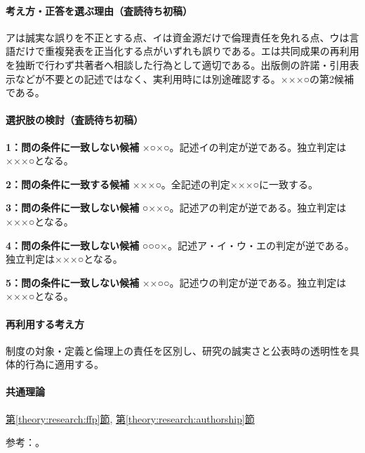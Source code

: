 \paragraph{考え方・正答を選ぶ理由（査読待ち初稿）} アは誠実な誤りを不正とする点、イは資金源だけで倫理責任を免れる点、ウは言語だけで重複発表を正当化する点がいずれも誤りである。エは共同成果の再利用を独断で行わず共著者へ相談した行為として適切である。出版側の許諾・引用表示などが不要との記述ではなく、実利用時には別途確認する。×××○の第2候補である。

\paragraph{選択肢の検討（査読待ち初稿）}\mbox{}\par

\noindent\textbf{1：問の条件に一致しない候補} ×○×○。記述イの判定が逆である。独立判定は×××○となる。\par

\noindent\textbf{2：問の条件に一致する候補} ×××○。全記述の判定×××○に一致する。\par

\noindent\textbf{3：問の条件に一致しない候補} ○××○。記述アの判定が逆である。独立判定は×××○となる。\par

\noindent\textbf{4：問の条件に一致しない候補} ○○○×。記述ア・イ・ウ・エの判定が逆である。独立判定は×××○となる。\par

\noindent\textbf{5：問の条件に一致しない候補} ××○○。記述ウの判定が逆である。独立判定は×××○となる。\par

\paragraph{再利用する考え方} 制度の対象・定義と倫理上の責任を区別し、研究の誠実さと公表時の透明性を具体的行為に適用する。

\paragraph{共通理論} \hyperref[theory:research:ffp]{第\ref*{theory:research:ffp}節}, \hyperref[theory:research:authorship]{第\ref*{theory:research:authorship}節}

\par 参考：\cite{mext_misconduct2014,jsps_integrity2025}。

